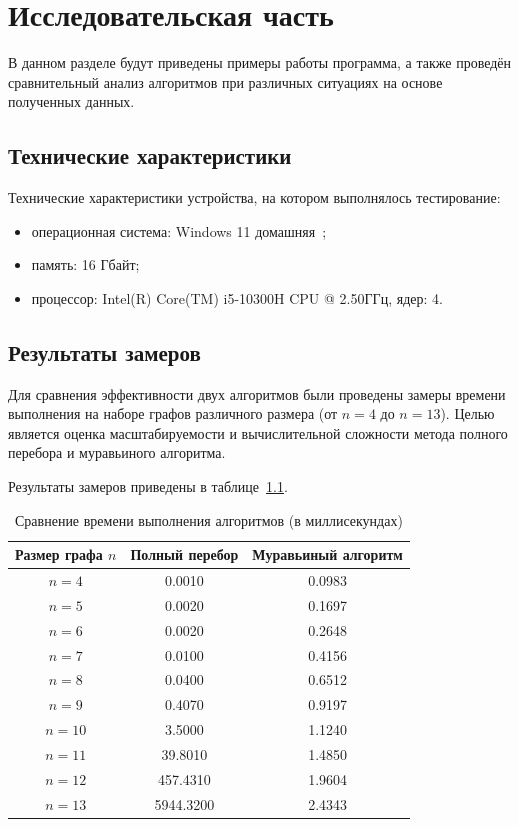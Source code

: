 \chapter{Исследовательская часть}

В данном разделе будут приведены примеры работы программа, а также проведён сравнительный анализ алгоритмов при различных ситуациях на основе полученных данных.

\section{Технические характеристики}

Технические характеристики устройства, на котором выполнялось тестирование:

\begin{itemize}
	\item операционная система: Windows 11 домашняя~\cite{windows11};
	\item память: 16 Гбайт;
	\item процессор: Intel(R) Core(TM) i5-10300H CPU @ 2.50ГГц, ядер: 4.~\cite{intel_i5}
\end{itemize}

\section{Результаты замеров}

Для сравнения эффективности двух алгоритмов были проведены замеры времени выполнения на наборе графов различного размера (от \(n = 4\) до \(n = 13\)).
Целью является оценка масштабируемости и вычислительной сложности метода полного перебора и муравьиного алгоритма.

Результаты замеров приведены в таблице~\ref{tab:time-compare}.

\begin{table}[h]
	\centering
	\caption{Сравнение времени выполнения алгоритмов (в миллисекундах)}
	\label{tab:time-compare}
	\begin{tabular}{|c|c|c|}
		\hline
		Размер графа \(n\) & Полный перебор & Муравьиный алгоритм \\ \hline
		\(n = 4\)  & 0.0010   & 0.0983 \\ 
		\(n = 5\)  & 0.0020   & 0.1697 \\ 
		\(n = 6\)  & 0.0020   & 0.2648 \\ 
		\(n = 7\)  & 0.0100   & 0.4156 \\ 
		\(n = 8\)  & 0.0400   & 0.6512 \\ 
		\(n = 9\)  & 0.4070   & 0.9197 \\ 
		\(n = 10\) & 3.5000   & 1.1240 \\ 
		\(n = 11\) & 39.8010  & 1.4850 \\ 
		\(n = 12\) & 457.4310 & 1.9604 \\ 
		\(n = 13\) & 5944.3200 & 2.4343 \\ 
		\hline
	\end{tabular}
\end{table}


